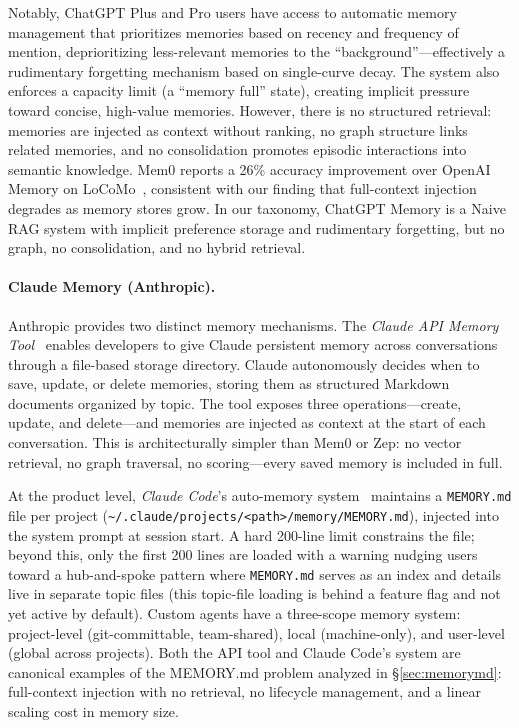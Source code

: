Notably, ChatGPT Plus and Pro users have access to automatic memory
management that prioritizes memories based on recency and frequency of
mention, deprioritizing less-relevant memories to the
``background''---effectively a rudimentary forgetting mechanism based on
single-curve decay. The system also enforces a capacity limit (a
``memory full'' state), creating implicit pressure toward concise,
high-value memories. However, there is no structured retrieval:
memories are injected as context without ranking, no graph structure
links related memories, and no consolidation promotes episodic
interactions into semantic knowledge. Mem0 reports a 26\% accuracy
improvement over OpenAI Memory on LoCoMo~\cite{choudhary2025mem0},
consistent with our finding that full-context injection degrades as
memory stores grow. In our taxonomy, ChatGPT Memory is a Naive RAG
system with implicit preference storage and rudimentary forgetting, but
no graph, no consolidation, and no hybrid retrieval.

\paragraph{Claude Memory (Anthropic).}
Anthropic provides two distinct memory mechanisms. The \emph{Claude API
Memory Tool}~\cite{anthropic2026memorytool} enables developers to give
Claude persistent memory across conversations through a file-based
storage directory. Claude autonomously decides when to save, update, or
delete memories, storing them as structured Markdown documents organized
by topic. The tool exposes three operations---create, update, and
delete---and memories are injected as context at the start of each
conversation. This is architecturally simpler than Mem0 or Zep: no
vector retrieval, no graph traversal, no scoring---every saved memory
is included in full.

At the product level, \emph{Claude Code}'s auto-memory
system~\cite{gurgone2026claudememory} maintains a
\texttt{MEMORY.md} file per project
(\texttt{\~{}/.claude/projects/<path>/memory/MEMORY.md}), injected into
the system prompt at session start. A hard 200-line limit constrains
the file; beyond this, only the first 200 lines are loaded with a
warning nudging users toward a hub-and-spoke pattern where
\texttt{MEMORY.md} serves as an index and details live in separate
topic files (this topic-file loading is behind a feature flag and not
yet active by default). Custom agents have a three-scope memory
system: project-level (git-committable, team-shared), local
(machine-only), and user-level (global across projects). Both the API
tool and Claude Code's system are canonical examples of the
MEMORY.md problem analyzed in \S\ref{sec:memorymd}: full-context
injection with no retrieval, no lifecycle management, and a linear
scaling cost in memory size.

